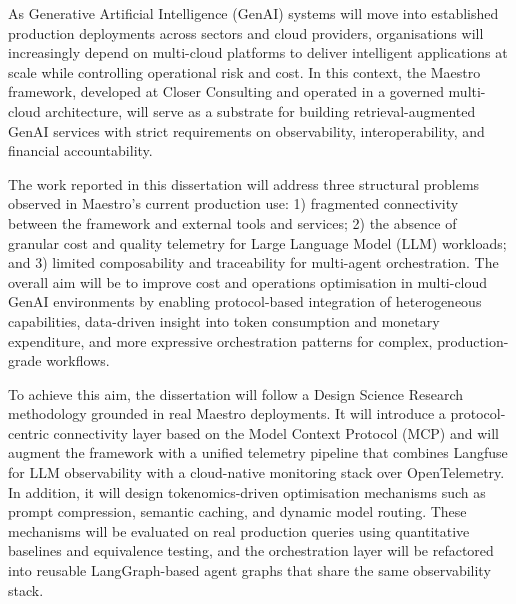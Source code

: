 
%

As Generative Artificial Intelligence (GenAI) systems will move into established production deployments across sectors and cloud providers, organisations will increasingly depend on multi-cloud platforms to deliver intelligent applications at scale while controlling operational risk and cost. In this context, the Maestro framework, developed at Closer Consulting and operated in a governed multi-cloud architecture, will serve as a substrate for building retrieval-augmented GenAI services with strict requirements on observability, interoperability, and financial accountability.

The work reported in this dissertation will address three structural problems observed in Maestro's current production use: 1) fragmented connectivity between the framework and external tools and services; 2) the absence of granular cost and quality telemetry for Large Language Model (LLM) workloads; and 3) limited composability and traceability for multi-agent orchestration. The overall aim will be to improve cost and operations optimisation in multi-cloud GenAI environments by enabling protocol-based integration of heterogeneous capabilities, data-driven insight into token consumption and monetary expenditure, and more expressive orchestration patterns for complex, production-grade workflows.

To achieve this aim, the dissertation will follow a Design Science Research methodology grounded in real Maestro deployments. It will introduce a protocol-centric connectivity layer based on the Model Context Protocol (MCP) and will augment the framework with a unified telemetry pipeline that combines Langfuse for LLM observability with a cloud-native monitoring stack over OpenTelemetry. In addition, it will design tokenomics-driven optimisation mechanisms such as prompt compression, semantic caching, and dynamic model routing. These mechanisms will be evaluated on real production queries using quantitative baselines and equivalence testing, and the orchestration layer will be refactored into reusable LangGraph-based agent graphs that share the same observability stack.

